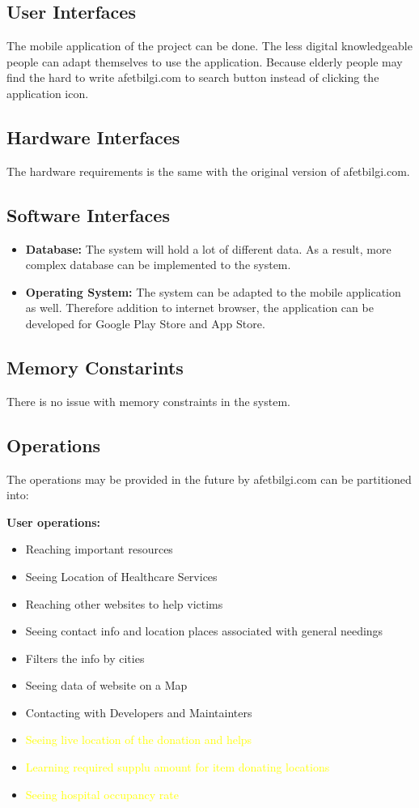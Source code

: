 \subsection*{User Interfaces}
The mobile application of the project can be done. The less digital knowledgeable people can adapt themselves to use the application.
Because elderly people may find the hard to write afetbilgi.com to search button instead of clicking the application icon. 

\subsection*{Hardware Interfaces}
The hardware requirements is the same with the original version of afetbilgi.com.

\subsection*{Software Interfaces}
\begin{itemize}
    \item \textbf{Database: } The system will hold a lot of different data. As a result, more complex database can be implemented to the system.
    \item \textbf{Operating System: } The system can be adapted to the mobile application as well. Therefore addition to internet browser, the application can be developed for Google Play Store and App Store.
\end{itemize}

\subsection*{Memory Constarints}
There is no issue with memory constraints in the system.

\subsection*{Operations}
The operations may be provided in the future by afetbilgi.com can be partitioned into:

\textbf{User operations: }

\begin{itemize}
    \item Reaching important resources
    \item Seeing Location of Healthcare Services
    \item Reaching other websites to help victims
    \item Seeing contact info and location places associated with general needings
    \item Filters the info by cities
    \item Seeing data of website on a Map
    \item Contacting with Developers and Maintainters
    \item \textcolor{yellow}{Seeing live location of the donation and helps}
    \item \textcolor{yellow}{Learning required supplu amount for item donating locations}
    \item \textcolor{yellow}{Seeing hospital occupancy rate}
\end{itemize}

